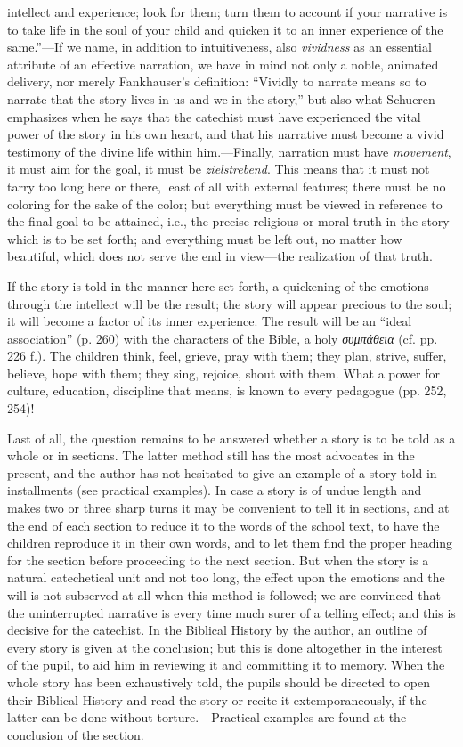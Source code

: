 intellect and experience; look for them; turn them to account if your narrative is to take life in the soul of your child and quicken it to an inner experience of the same.”—If we name, in addition to intuitiveness, also \emph{vividness} as an essential attribute of an effective narration, we have in mind not only a noble, animated delivery, nor merely Fankhauser’s definition: “Vividly to narrate means so to narrate that the story lives in us and we in the story,” but also what Schueren emphasizes when he says that the catechist must have experienced the vital power of the story in his own heart, and that his narrative must become a vivid testimony of the divine life within him.—Finally, narration must have \emph{movement}, it must aim for the goal, it must be \emph{zielstrebend}. This means that it must not tarry too long here or there, least of all with external features; there must be no coloring for the sake of the color; but everything must be viewed in reference to the final goal to be attained, i.e., the precise religious or moral truth in the story which is to be set forth; and everything must be left out, no matter how beautiful, which does not serve the end in view—the realization of that truth.

If the story is told in the manner here set forth, a quickening of the emotions through the intellect will be the result; the story will appear precious to the soul; it will become a factor of its inner experience. The result will be an “ideal association” (p. 260) with the characters of the Bible, a holy \emph{συμπάθεια} (cf. pp. 226 f.). The children think, feel, grieve, pray with them; they plan, strive, suffer, believe, hope with them; they sing, rejoice, shout with them. What a power for culture, education, discipline that means, is known to every pedagogue (pp. 252, 254)!

Last of all, the question remains to be answered whether a story is to be told as a whole or in sections. The latter method still has the most advocates in the present, and the author has not hesitated to give an example of a story told in installments (see practical examples). In case a story is of undue length and makes two or three sharp turns it may be convenient to tell it in sections, and at the end of each section to reduce it to the words of the school text, to have the children reproduce it in their own words, and to let them find the proper heading for the section before proceeding to the next section. But when the story is a
natural catechetical unit and not too long, the effect upon the emotions and the will is not subserved at all when this method is followed; we are convinced that the uninterrupted narrative is every time much surer of a telling effect; and this is decisive for the catechist. In the Biblical History by the author, an outline of every story is given at the conclusion; but this is done altogether in the interest of the pupil, to aid him in reviewing it and committing it to memory. When the whole story has been exhaustively told, the pupils should be directed to open their Biblical History and read the story or recite it extemporaneously, if the latter can be done without torture.—Practical examples are found at the conclusion of the section.


